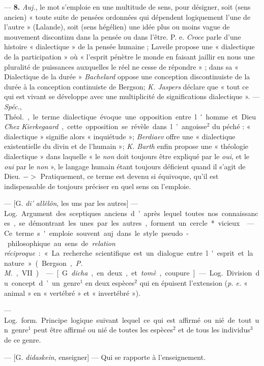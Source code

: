 \begin{itemize}[leftmargin=1cm, label=, itemsep=1pt]
— {\bf 8.} {\it Auj.}, le mot s'emploie en
une multitude de sens, pour désigner, soit (sens ancien) « toute suite
de pensées ordonnées qui dépendent
logiquement l’une de l’autre » (Lalande), soit (sens hégélien) une idée
plus ou moins vague de mouvement
discontinu dans la pensée ou dans
l’être. P. e. {\it Croce} parle d’une histoire
« dialectique » de la pensée humaine ;
Laveile propose une « dialectique de
la participation » où « l'esprit pénètre
le monde en faisant jaillir en nous
une pluralité de puissances auxquelles le réel ne cesse de répondre » ;
dans sa « Dialectique de la durée »
{\it Bachelard} oppose une conception
discontinuiste de la durée à la conception continuiste de Bergson;
{\it K. Jaspers} déclare que « tout ce qui
est vivant se développe avec une
multiplicité de significations dialectique ». — {\it Spéc.}, \si{Théol.}, le terme
dialectique évoque une opposition
entre l'homme et Dieu. {\it Chez Kierkegaard}, cette opposition se révèle
dans l’angoisse$^2$ du péché : « dialectique » signifie alors « inquiétude »;
{\it Berdiaev} offre une « dialectique
existentielle du divin et de l’humain »; {\it K. Barth} enfin propose une
« théologie dialectique » dans laquelle « le {\it non} doit toujours être
expliqué par le {\it oui}, et le {\it oui} par le
{\it non} », le langage humain étant toujours déficient quand il s’agit de
Dieu. $->$ Pratiquement, ce terme
est devenu si équivoque, qu'il est
indispensable de toujours préciser
en quel sens on l’emploie.

 — [G. {\it di’ allêlôn}, les uns par les
autres] — \si{Log.} Argument des
sceptiques anciens d’après lequel
toutes nos connaissances, se démontrant les unes par les autres, forment un cercle* vicieux.

 — Ce terme s'emploie souvent auj. dans le style pseudo-philosophique au sens de {\it relation réciproque} : « La recherche scientifique
est un dialogue entre l'esprit et la
nature » (Bergson, {\it P. M.}, VII).

 — [G. {\it dicha}, en deux, et
{\it tomè}, coupure] — \si{Log.} Division
du concept d’un genre$^1$ en deux espèces$^2$ qui en épuisent l’extension
({\it p. e.} « animal » en « vertébré » et
« invertébré »).

 — \si{Log.}
\si{form.} Principe logique suivant lequel ce qui est affirmé ou nié de
tout un genre$^1$ peut être affirmé ou
nié de toutes les espèces$^2$ et de tous
les individus$^3$ de ce genre.

 — [G. {\it didaskein}, enseigner]
— Qui se rapporte à l’enseignement.


\end{itemize}

